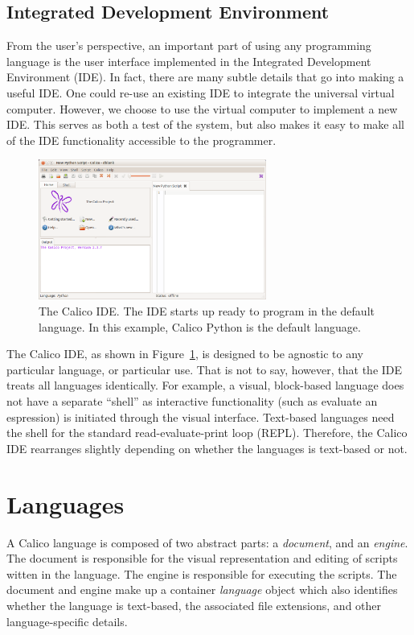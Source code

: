 \documentclass[preprint]{sigplanconf}
\begin{document}
\subsection{Integrated Development Environment}

From the user's perspective, an important part of using any
programming language is the user interface implemented in the
Integrated Development Environment (IDE). In fact, there are many
subtle details that go into making a useful IDE. One could re-use an
existing IDE to integrate the universal virtual computer. However, we
choose to use the virtual computer to implement a new IDE. This serves
as both a test of the system, but also makes it easy to make all of
the IDE functionality accessible to the programmer. 

\begin{figure}[h!]
  \centering
     \includegraphics[width=75mm]{calico.eps}
  \caption{The Calico IDE. The IDE starts up ready to program in the
    default language. In this example, Calico Python is the default
    language.}
  \label{calico-ide}
\end{figure}

The Calico IDE, as shown in Figure~\ref{calico-ide}, is designed to be
agnostic to any particular language, or particular use. That is not to
say, however, that the IDE treats all languages identically. For
example, a visual, block-based language does not have a separate
``shell'' as interactive functionality (such as evaluate an
espression) is initiated through the visual interface. Text-based
languages need the shell for the standard read-evaluate-print loop
(REPL). Therefore, the Calico IDE rearranges slightly depending on
whether the languages is text-based or not.

\section{Languages}

A Calico language is composed of two abstract parts: a
\textit{document}, and an \textit{engine}. The document is responsible
for the visual representation and editing of scripts witten in the
language. The engine is responsible for executing the scripts. The
document and engine make up a container \textit{language} object which
also identifies whether the language is text-based, the associated
file extensions, and other language-specific details.
\end{document}
